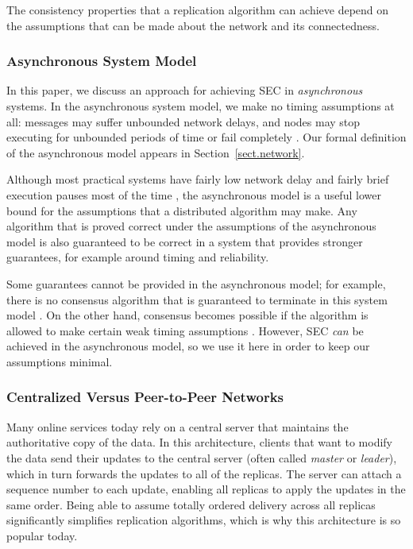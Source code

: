 The consistency properties that a replication algorithm can achieve depend on the assumptions that
can be made about the network and its connectedness.

\subsubsection{Asynchronous System Model}

In this paper, we discuss an approach for achieving SEC in \emph{asynchronous} systems. In the
asynchronous system model, we make no timing assumptions at all: messages may suffer unbounded
network delays, and nodes may stop executing for unbounded periods of time or fail completely
\cite{Cachin:2011wt}. Our formal definition of the asynchronous model appears in
Section~\ref{sect.network}.

Although most practical systems have fairly low network delay and fairly brief execution pauses most
of the time \cite{Bailis:2014jx}, the asynchronous model is a useful lower bound for the assumptions
that a distributed algorithm may make. Any algorithm that is proved correct under the assumptions of
the asynchronous model is also guaranteed to be correct in a system that provides stronger
guarantees, for example around timing and reliability.

Some guarantees cannot be provided in the asynchronous model; for example, there is no consensus
algorithm that is guaranteed to terminate in this system model \cite{Fischer:1985tt}. On the other
hand, consensus becomes possible if the algorithm is allowed to make certain weak timing assumptions
\cite{Chandra:1996cp}. However, SEC \emph{can} be achieved in the asynchronous model, so we use it
here in order to keep our assumptions minimal.

\subsubsection{Centralized Versus Peer-to-Peer Networks}

Many online services today rely on a central server that maintains the authoritative copy of the
data. In this architecture, clients that want to modify the data send their updates to the central
server (often called \emph{master} or \emph{leader}), which in turn forwards the updates to all of
the replicas. The server can attach a sequence number to each update, enabling all replicas to apply
the updates in the same order. Being able to assume totally ordered delivery across all replicas
significantly simplifies replication algorithms, which is why this architecture is so popular today.

